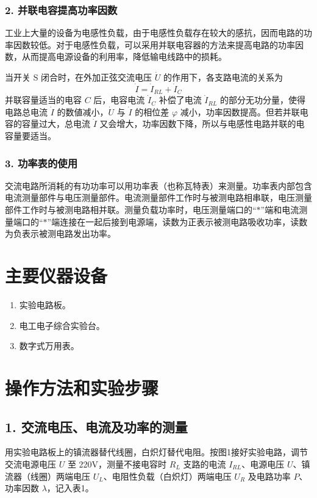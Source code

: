 ﻿\documentclass[10.5pt]{config}
\begin{document}
\subsubsection*{2. 并联电容提高功率因数}

工业上大量的设备为电感性负载，由于电感性负载存在较大的感抗，因而电路的功率因数较低。对于电感性负载，可以采用并联电容器的方法来提高电路的功率因数，从而提高电源设备的利用率，降低输电线路中的损耗。

当开关 S 闭合时，在外加正弦交流电压 $\dot{U}$ 的作用下，各支路电流的关系为
\begin{equation*}
    \dot{I} = \dot{I}_{RL} + \dot{I}_C
\end{equation*}
并联容量适当的电容 $C$ 后，电容电流 $\dot{I}_C$ 补偿了电流 $\dot{I}_{RL}$ 的部分无功分量，使得电路总电流 $\dot{I}$ 的数値减小，$\dot{U}$ 与 $\dot{I}$ 的相位差 $\varphi$ 减小，功率因数提高。但若并联电容的容量过大，总电流 $\dot{I}$ 又会增大，功率因数下降，所以与电感性电路并联的电容量要适当。

\subsubsection*{3. 功率表的使用}

交流电路所消耗的有功功率可以用功率表（也称瓦特表）来测量。功率表内部包含电流测量部件与电压测量部件。电流测量部件工作时与被测电路相串联，电压测量部件工作时与被测电路相并联。测量负载功率时，电压测量端口的“$*$”端和电流测量端口的“$*$”端连接在一起后接到电源端，读数为正表示被测电路吸收功率，读数为负表示被测电路发出功率。



\section{主要仪器设备}
\begin{enumerate}[label=\arabic*., leftmargin=2em]
    \item 实验电路板。
    \item 电工电子综合实验台。
    \item 数字式万用表。

\end{enumerate}

\section{操作方法和实验步骤}

\subsection*{1. 交流电压、电流及功率的测量}
用实验电路板上的镇流器替代线圈，白炽灯替代电阻。按图1接好实验电路，调节交流电源电压 $U$ 至 220V，测量不接电容时 $R_L$ 支路的电流 $I_{RL}$、电源电压 $U$、镇流器（线圈）两端电压 $U_L$、电阻性负载（白炽灯）两端电压 $U_R$ 及电路功率 $P$、功率因数 $\lambda$，记入表1。
\end{document}
